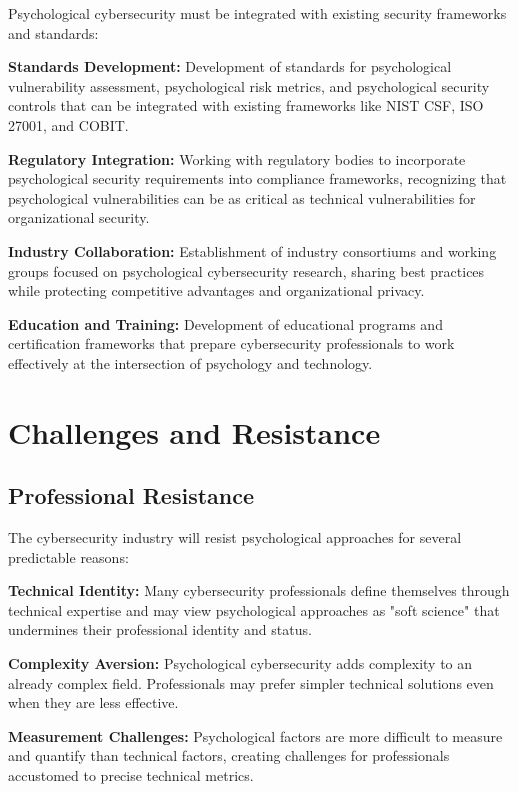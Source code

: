 \documentclass[10pt, twocolumn]{article}
\begin{document}
Psychological cybersecurity must be integrated with existing security frameworks and standards:

\textbf{Standards Development:} Development of standards for psychological vulnerability assessment, psychological risk metrics, and psychological security controls that can be integrated with existing frameworks like NIST CSF, ISO 27001, and COBIT.

\textbf{Regulatory Integration:} Working with regulatory bodies to incorporate psychological security requirements into compliance frameworks, recognizing that psychological vulnerabilities can be as critical as technical vulnerabilities for organizational security.

\textbf{Industry Collaboration:} Establishment of industry consortiums and working groups focused on psychological cybersecurity research, sharing best practices while protecting competitive advantages and organizational privacy.

\textbf{Education and Training:} Development of educational programs and certification frameworks that prepare cybersecurity professionals to work effectively at the intersection of psychology and technology.

\section{Challenges and Resistance}

\subsection{Professional Resistance}

The cybersecurity industry will resist psychological approaches for several predictable reasons:

\textbf{Technical Identity:} Many cybersecurity professionals define themselves through technical expertise and may view psychological approaches as "soft science" that undermines their professional identity and status.

\textbf{Complexity Aversion:} Psychological cybersecurity adds complexity to an already complex field. Professionals may prefer simpler technical solutions even when they are less effective.

\textbf{Measurement Challenges:} Psychological factors are more difficult to measure and quantify than technical factors, creating challenges for professionals accustomed to precise technical metrics.
\end{document}
